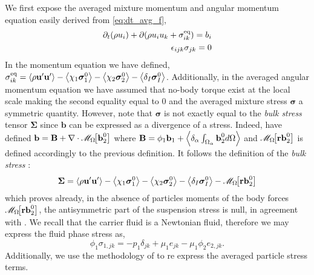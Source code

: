 We first expose the averaged mixture momentum and angular momentum equation easily derived from \ref{eq:dt_avg_f}, 
\begin{align}
    \partial_t (\rho u_i)
    + \partial (\rho u_iu_k
    + \sigma_{ik}^\text{eq})
    = b_i\\
    \epsilon_{ijk} \sigma_{jk}
    = 0 
    \label{eq:momentum_bulk}
\end{align}
In the momentum equation we have defined, $\sigma_{ik}^\text{eq} = \left<\rho\textbf{u}'\textbf{u}'\right>
- \left<\chi_1\bm{\sigma}_1^0\right>-\left<\chi_2\bm{\sigma}_2^0\right> - \left<\delta_I \bm{\sigma}_I^0\right>$. 
Additionally, in the averaged angular momentum equation we have assumed that no-body torque exist at the local scale making the second equality equal to $0$ \citet{leal2007advanced} and the averaged mixture stress $\bm{\sigma}$ a symmetric quantity. 
However, note that $\bm{\sigma}$ is not exactly equal to the \textit{bulk stress} tensor $\bm{\Sigma}$ since $\textbf{b}$ can be expressed as a divergence of a stress.
Indeed, have defined $\textbf{b} = \textbf{B} + \mathbf{\nabla}\cdot  \mathscr{M}_\Omega\!\!\left[\textbf{b}_2^0\right]$ where $\textbf{B} = \phi_1 \textbf{b}_1 +  \left<\delta_\alpha \int_{\Omega_\alpha} \textbf{b}_2^0  d\Omega\right>$ and  $\mathscr{M}_\Omega\!\!\left[\textbf{r}\textbf{b}_2^0\right]$ is defined accordingly to the previous definition. 
It follows the definition of the \textit{bulk stress} : 
\begin{equation}
    \bm{\Sigma}
    = 
    \left<\rho\textbf{u}'\textbf{u}'\right>
    - \left<\chi_1\bm{\sigma}_1^0\right>
    - \left<\chi_2\bm{\sigma}_2^0\right> 
    - \left<\delta_I \bm{\sigma}_I^0\right>
    - \mathscr{M}_\Omega\!\!\left[\textbf{r}\textbf{b}_2^0\right]
\end{equation}
which proves already, in the absence of particles moments of the body forces $\mathscr{M}_\Omega\!\!\left[\textbf{r}\textbf{b}_2^0\right]$, the antisymmetric part of the suspension stress is null, in agreement with \citet{dolata2020heterogeneous}.
We recall that the carrier fluid is a Newtonian fluid, therefore we may express the fluid phase stress as, 
\begin{equation}
    \phi_1 \sigma_{1,jk}
    = -p_1 \delta_{jk}
    + \mu_1 e_{jk}
    - \mu_1 \phi_2 e_{2,jk}. 
\end{equation} 
Additionally, we use the methodology of \citep{lhuillier1992volume,lhuillier1996contribution} to re express the averaged particle stress terms. 
